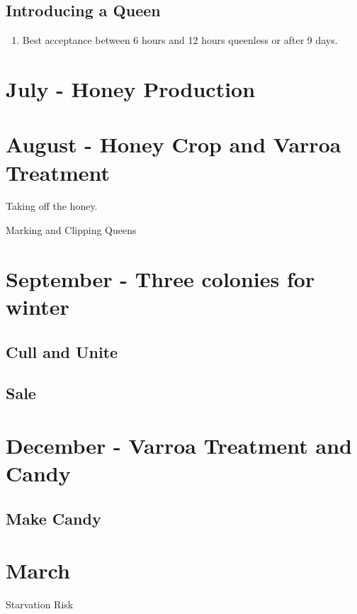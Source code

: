 \documentclass{./BeekeepingBook}
\begin{document}
\subsection{Introducing a Queen}
 
 \begin{enumerate}
	\item{Best acceptance between 6 hours and 12 hours queenless or after 9 days.}
\end{enumerate}
 
 
 
\section{July - Honey Production}


 
\section{August - Honey Crop and Varroa Treatment}

Taking off the honey.

Marking and Clipping Queens


\section{September - Three colonies for winter}

\subsection{Cull and Unite}


\subsection{Sale}

\section{December - Varroa Treatment and Candy}

\subsection{Make Candy}




\section{March}{Starvation Risk}
\end{document}
